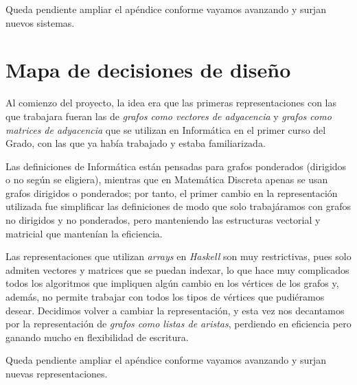 \begin{comentario}
    Queda pendiente ampliar el apéndice conforme vayamos avanzando y surjan nuevos
    sistemas.
\end{comentario}

\section{Mapa de decisiones de diseño}

Al comienzo del proyecto, la idea era que las primeras representaciones con las que 
trabajara fueran las de \textit{grafos como vectores de adyacencia} y 
\textit{grafos como matrices de adyacencia} que se utilizan en Informática en el
primer curso del Grado, con las que ya había trabajado y estaba familiarizada. 

Las definiciones de Informática están pensadas para grafos ponderados (dirigidos 
o no según se eligiera), mientras que en Matemática Discreta apenas se usan grafos 
dirigidos o ponderados; por tanto, el primer cambio en la representación 
utilizada fue simplificar las definiciones de modo que solo trabajáramos con grafos
no dirigidos y no ponderados, pero manteniendo las estructuras vectorial y 
matricial que mantenían la eficiencia. 

Las representaciones que utilizan \textit{arrays} en \textit{Haskell} son muy
restrictivas, pues solo admiten vectores y matrices que se puedan indexar, lo
que hace muy complicados todos los algoritmos que impliquen algún cambio en los
vértices de los grafos y, además, no permite trabajar con todos los tipos de
vértices que pudiéramos desear. Decidimos volver a cambiar la representación, y
esta vez nos decantamos por la representación de \textit{grafos como listas de
aristas}, perdiendo en eficiencia pero ganando mucho en flexibilidad de
escritura.

\begin{comentario}
  Queda pendiente ampliar el apéndice conforme vayamos avanzando y surjan
  nuevas representaciones.
\end{comentario}

